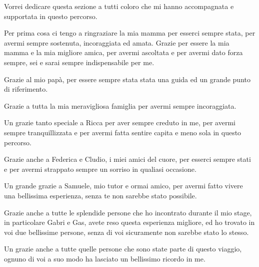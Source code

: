 \thispagestyle{plain}
Vorrei dedicare questa sezione a tutti coloro che mi hanno accompagnata e supportata in questo percorso. 


Per prima cosa ci tengo a ringraziare la mia mamma per esserci sempre stata, per avermi sempre sostenuta, incoraggiata ed amata. Grazie per essere la mia mamma e la mia migliore amica, per avermi ascoltata e per avermi dato forza sempre, sei e sarai sempre indispensabile per me.

Grazie al mio papà, per essere sempre stata stata una guida ed un grande punto di riferimento. 

Grazie a tutta la mia meravigliosa famiglia per avermi sempre incoraggiata.

Un grazie tanto speciale a Ricca per aver sempre creduto in me, per avermi sempre tranquillizzata e per avermi fatta sentire capita e meno sola in questo percorso. 

Grazie anche a Federica e Cludio, i miei amici del cuore, per esserci sempre stati e per avermi strappato sempre un sorriso in qualiasi occasione.

Un grande grazie a Samuele, mio tutor e ormai amico, per avermi fatto vivere una bellissima esperienza, senza te non sarebbe stato possibile.

Grazie anche a tutte le splendide persone che ho incontrato durante il mio stage, in particolare Gabri e Gas, avete reso questa esperienza migliore, ed ho trovato in voi due bellissime persone, senza di voi sicuramente non sarebbe stato lo stesso.  

Un grazie anche a tutte quelle persone che sono state parte di questo viaggio, ognuno di voi a suo modo ha lasciato un bellissimo ricordo in me.

